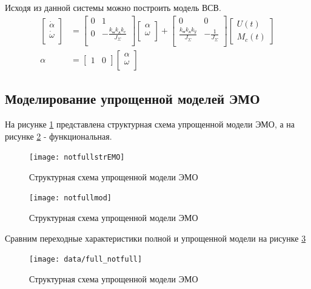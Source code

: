 \documentclass[a4paper, 12pt]{article}
\begin{document}
Исходя из данной системы можно построить модель ВСВ.
\begin{align}
\begin{bmatrix}
\dot{\alpha} \\
\dot{\omega} \\
\end{bmatrix} & = 
\begin{bmatrix}
0 & 1 \\
0 & -\frac{k_\text{м}k_\text{д}k_e}{J_\Sigma} \\
\end{bmatrix}
\begin{bmatrix}
\alpha \\
\omega \\
\end{bmatrix} + 
\begin{bmatrix}
0 & 0 \\
\frac{k_\text{м}k_\text{д}k_y}{J_\Sigma} & -\frac{1}{J_\Sigma} \\
\end{bmatrix}
\begin{bmatrix}
U(t) \\
M_c(t)
\end{bmatrix} \\
\alpha & = 
\begin{bmatrix}
1 & 0 
\end{bmatrix}
\begin{bmatrix}
\alpha \\
\omega \\
\end{bmatrix}
\end{align}

\newpage
\begin{center}
	\section{Моделирование упрощенной моделей ЭМО}
\end{center}\par
На рисунке \ref{nstrEMO} представлена структурная схема упрощенной модели ЭМО, а на рисунке \ref{nfuncEMO}  - функциональная.

\begin{figure}[h!]
	\centering
	\texttt{[image: notfullstrEMO]}
	\caption{Структурная схема упрощенной модели ЭМО}
	\label{nstrEMO}
\end{figure}

\begin{figure}[h!]
	\centering
	\texttt{[image: notfullmod]}
	\caption{Структурная схема упрощенной модели ЭМО}
	\label{nfuncEMO}
\end{figure}
Сравним переходные характеристики полной и упрощенной модели на рисунке \ref{full_nfull}
\newpage
\begin{figure}[h!]
	\centering
	\texttt{[image: data/full\_notfull]}
	\caption{Структурная схема упрощенной модели ЭМО}
	\label{full_nfull}
\end{figure}
 
\end{document}
